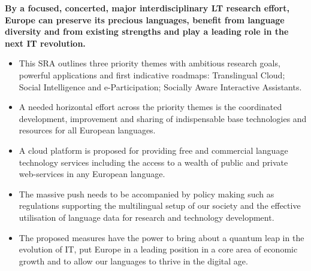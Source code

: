 \documentclass[10pt, plain]{../../metanetpaper}
\begin{document}
\textbf{By a focused, concerted, major interdisciplinary LT research effort, Europe can preserve its precious languages, benefit from language diversity and from existing strengths and play a leading role in the next IT revolution.}
\begin{itemize}
\item This SRA outlines three priority themes with ambitious research goals, powerful applications and first indicative roadmaps: Translingual Cloud; Social Intelligence and e-Participation; Socially Aware Interactive Assistants.
\item A needed horizontal effort across the priority themes is the coordinated development, improvement and sharing of indispensable base technologies and resources for all European languages.
\item A cloud platform is proposed for providing free and commercial language technology services including the access to a wealth of public and private web-services in any European language.
\item The massive push needs to be accompanied by policy making such as regulations supporting the multilingual setup of our society and the effective utilisation of language data for research and technology development.
\item The proposed measures have the power to bring about a quantum leap in the evolution of IT, put Europe in a leading position in a core area of economic growth and to allow our languages to thrive in the digital age.
\end{itemize}

\cleardoublepage



\end{document}

